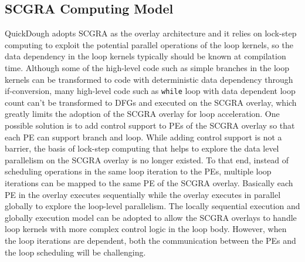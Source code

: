 \subsection{SCGRA Computing Model}
QuickDough adopts SCGRA as the overlay architecture and it relies on lock-step computing to exploit the potential parallel operations of the loop kernels, so the data dependency in the loop kernels typically should be known at compilation time. Although some of the high-level code such as simple branches in the loop kernels can be transformed to code with deterministic data dependency through if-conversion, many high-level code such as \texttt{while} loop with data dependent loop count can't be transformed to DFGs and executed on the SCGRA overlay, which greatly limits the adoption of the SCGRA overlay for loop acceleration. One possible solution is to add control support to PEs of the SCGRA overlay so that each PE can support branch and loop. While adding control support is not a barrier, the basis of lock-step computing that helps to explore the data level parallelism on the SCGRA overlay is no longer existed. To that end, instead of scheduling operations in the same loop iteration to the PEs, multiple loop iterations can be mapped to the same PE of the SCGRA overlay. Basically each PE in the overlay executes sequentially while the overlay executes in parallel globally to explore the loop-level parallelism. The locally sequential execution and globally execution model can be adopted to allow the SCGRA overlays to handle loop kernels with more complex control logic in the loop body. However, when the loop iterations are dependent, both the communication between the PEs and the loop scheduling will be challenging.
